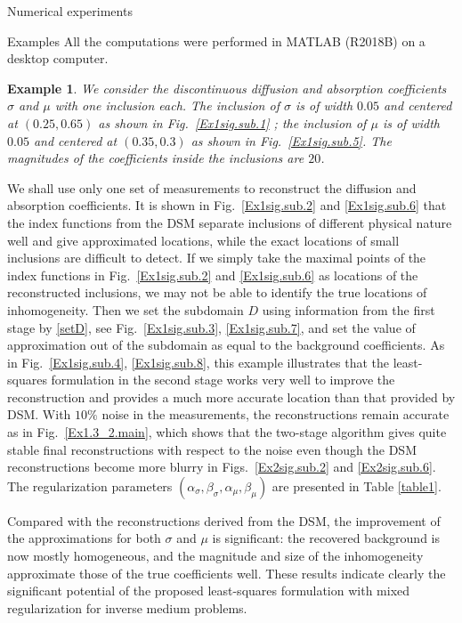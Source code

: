 \documentclass[11pt]{article}%
\renewcommand{\_}{{\fontfamily{ptm}\selectfont\textunderscore}}
\theoremstyle{plain}
\numberwithin{equation}{section}
\newtheorem{exam}{Example}
\begin{document}
\begin{section}{Numerical experiments}
\begin{subsection}{Examples}
All the computations were performed in MATLAB (R2018B) on a desktop computer.
\begin{exam}\label{example1}
 We consider the discontinuous diffusion and absorption coefficients $\sigma$ and $\mu$  with one inclusion each. The inclusion of $\sigma$ is of width $0.05$ and centered at $(0.25,0.65)$ as shown in Fig.~\ref{Ex1sig.sub.1} ; 
 the inclusion of $\mu$ is of width $0.05$ and centered at $(0.35,0.3)$ as shown in Fig.~\ref{Ex1sig.sub.5}. The magnitudes of the coefficients inside the inclusions are $20$.
\end{exam}
We shall use only one set of measurements to reconstruct the diffusion and absorption coefficients.
It is shown  in Fig.~\ref{Ex1sig.sub.2} and \ref{Ex1sig.sub.6} that the index functions from the DSM separate inclusions of different physical nature well and give approximated locations, while the exact locations of small inclusions are difficult to detect. 
If we simply take the maximal points of the index functions  in Fig.~\ref{Ex1sig.sub.2} and \ref{Ex1sig.sub.6} as  locations of the reconstructed inclusions, we may not be able to identify the true locations of inhomogeneity. 
Then we set the subdomain $D$ using information from the first stage by \eqref{setD}, see Fig.~\ref{Ex1sig.sub.3}, \ref{Ex1sig.sub.7},  and set the value of approximation out of the subdomain as equal to the background coefficients. 
As in Fig.~\ref{Ex1sig.sub.4}, \ref{Ex1sig.sub.8}, this example illustrates that the least-squares formulation in the second stage works very well to improve the reconstruction and provides a much more accurate location than 
that provided by DSM. With $10 \%$ noise in the measurements, the reconstructions remain accurate as in Fig.~\ref{Ex1.3_2.main}, which shows that the two-stage algorithm gives quite stable final reconstructions with respect to the noise 
even though the DSM reconstructions become more blurry in Figs.~\ref{Ex2sig.sub.2} and \ref{Ex2sig.sub.6}.  
The regularization parameters $(\alpha_\sigma,\beta_\sigma,\alpha_\mu,\beta_\mu)$ are presented in Table \ref{table1}. 

Compared with the reconstructions derived from the DSM, the improvement of the approximations for both $\sigma$ and $\mu$ is significant: the recovered background is now mostly homogeneous, and the magnitude and size of the inhomogeneity approximate those of the true coefficients well. These results indicate clearly the significant potential of the proposed least-squares formulation with mixed regularization for inverse medium problems.


\end{subsection}
\end{section}
\end{document}
